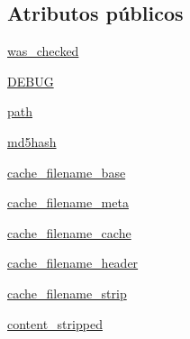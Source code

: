 \subsection*{Atributos públicos}
\begin{DoxyCompactItemize}
\item 
\hyperlink{class_cache_1_1_file_cache_ac795fe342f956e8b8cd2ec23267c674d}{was\-\_\-checked}
\item 
\hyperlink{class_cache_1_1_file_cache_aca5f594f2c828bbb00e29385b527b5c4}{D\-E\-B\-U\-G}
\item 
\hyperlink{class_cache_1_1_file_cache_a969a9af6b255a6d9b14d71ee429cf6af}{path}
\item 
\hyperlink{class_cache_1_1_file_cache_a2b1c48cd0ee88344f405391545633787}{md5hash}
\item 
\hyperlink{class_cache_1_1_file_cache_ad4c782bcbd654eff2aea4c3b76815723}{cache\-\_\-filename\-\_\-base}
\item 
\hyperlink{class_cache_1_1_file_cache_abb789c23d266d9148f2fb9c3bc3e8d3c}{cache\-\_\-filename\-\_\-meta}
\item 
\hyperlink{class_cache_1_1_file_cache_af64994359a6b953e12a1f3352cbf057a}{cache\-\_\-filename\-\_\-cache}
\item 
\hyperlink{class_cache_1_1_file_cache_a4a427efcf91e7550463882b99d6b3df2}{cache\-\_\-filename\-\_\-header}
\item 
\hyperlink{class_cache_1_1_file_cache_a7a879f97bdb8d6f8a5b14390db395cdf}{cache\-\_\-filename\-\_\-strip}
\item 
\hyperlink{class_cache_1_1_file_cache_a6660cc5f8e2408bdece63291305a5e5e}{content\-\_\-stripped}
\end{DoxyCompactItemize}
